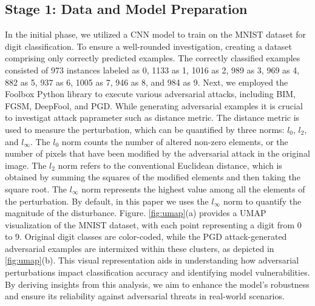 \documentclass[10pt, conference, a4paper, final]{IEEEtran}
\begin{document}
\subsection{Stage 1: Data and Model Preparation}

In the initial phase, we utilized a CNN model to train on the MNIST dataset for digit classification. To ensure a well-rounded investigation, creating a dataset comprising only correctly predicted examples. The correctly classified examples consisted of 973 instances labeled as 0, 1133 as 1, 1016 as 2, 989 as 3, 969 as 4, 882 as 5, 937 as 6, 1005 as 7, 946 as 8, and 984 as 9. Next, we employed the Foolbox Python library to execute various adversarial attacks, including BIM, FGSM, DeepFool, and PGD. While generating adversarial examples it is crucial to investigat attack paprameter such as distance metric. The distance metric is used to measure the perturbation, which can be quantified by three norms: \( l_0 \), \( l_2 \), and 
\( l_{\infty} \). The \( l_0 \) norm counts the number of altered non-zero elements, or the number of pixels that have been modified by the adversarial attack in the original image. The \( l_2 \) norm refers to the conventional Euclidean distance, which is obtained by summing the squares of the modified elements and then taking the square root. The \( l_{\infty} \) norm represents the highest value among all the elements of the perturbation. By default, in this paper we uses the 
\( l_{\infty} \) norm to quantify the magnitude of the disturbance. Figure. \ref{fig:umap}(a) provides a UMAP visualization of the MNIST dataset, with each point representing a digit from 0 to 9. Original digit classes are color-coded, while the PGD attack-generated adversarial examples are intermixed within these clusters, as depicted in \ref{fig:umap}(b). This visual representation aids in understanding how adversarial perturbations impact classification accuracy and identifying model vulnerabilities. By deriving insights from this analysis, we aim to enhance the model's robustness and ensure its reliability against adversarial threats in real-world scenarios.
\end{document}
